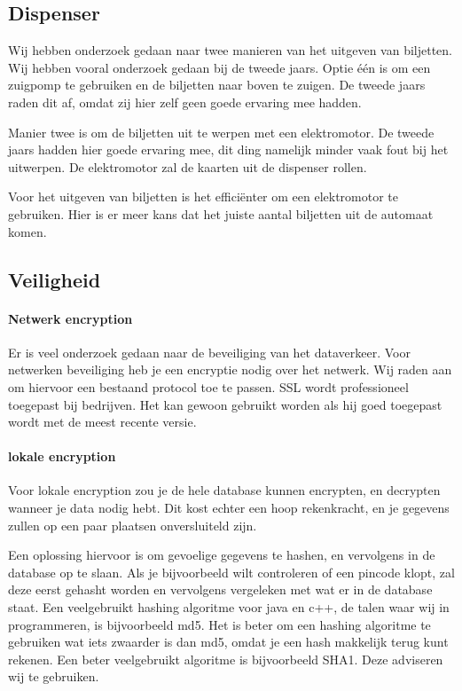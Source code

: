 \documentclass{article}
\begin{document}
\subsection{Dispenser}

Wij hebben onderzoek gedaan naar twee manieren van het uitgeven van biljetten.
Wij hebben vooral onderzoek gedaan bij de tweede jaars.
Optie \'e\'en is om een zuigpomp te gebruiken en de biljetten naar boven te zuigen.
De tweede jaars raden dit af, omdat zij hier zelf geen goede ervaring mee hadden.

Manier twee is om de biljetten uit te werpen met een elektromotor.
De tweede jaars hadden hier goede ervaring mee, dit ding namelijk minder vaak fout bij het uitwerpen.
De elektromotor zal de kaarten uit de dispenser rollen.

Voor het uitgeven van biljetten is het effici\"enter om een elektromotor te gebruiken.
Hier is er meer kans dat het juiste aantal biljetten uit de automaat komen.

\newpage

\subsection{Veiligheid}

\paragraph{Netwerk encryption}

Er is veel onderzoek gedaan naar de beveiliging van het dataverkeer.
Voor netwerken beveiliging heb je een encryptie nodig over het netwerk.
Wij raden aan om hiervoor een bestaand protocol toe te passen.
SSL wordt professioneel toegepast bij bedrijven.
Het kan gewoon gebruikt worden als hij goed toegepast wordt met de meest recente versie.

\paragraph{lokale encryption}

Voor lokale encryption zou je de hele database kunnen encrypten, en decrypten wanneer je data nodig hebt.
Dit kost echter een hoop rekenkracht, en je gegevens zullen op een paar plaatsen onversluiteld zijn.

Een oplossing hiervoor is om gevoelige gegevens te hashen, en vervolgens in de database op te slaan.
Als je bijvoorbeeld wilt controleren of een pincode klopt, zal deze eerst gehasht worden en vervolgens vergeleken met wat er in de database staat.
Een veelgebruikt hashing algoritme voor java en c++, de talen waar wij in programmeren, is bijvoorbeeld md5.
Het is beter om een hashing algoritme te gebruiken wat iets zwaarder is dan md5, omdat je een hash makkelijk terug kunt rekenen.
Een beter veelgebruikt algoritme is bijvoorbeeld SHA1.
Deze adviseren wij te gebruiken.
\end{document}
